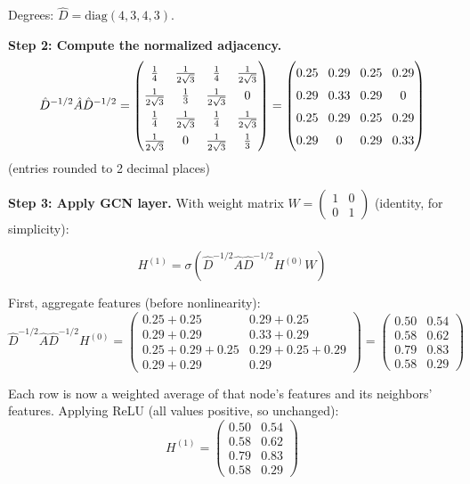 \begin{notechapter}
\begin{example}
Degrees: $\hat{D} = \text{diag}(4, 3, 4, 3)$.

\textbf{Step 2: Compute the normalized adjacency.}
\[
\hat{D}^{-1/2} \hat{A} \hat{D}^{-1/2} =
{
\renewcommand{\arraystretch}{1.5} %
\setlength{\arraycolsep}{4pt}    %
\begin{pmatrix} 
\frac{1}{4} & \frac{1}{2\sqrt{3}} & \frac{1}{4} & \frac{1}{2\sqrt{3}} \\ 
\frac{1}{2\sqrt{3}} & \frac{1}{3} & \frac{1}{2\sqrt{3}} & 0 \\ 
\frac{1}{4} & \frac{1}{2\sqrt{3}} & \frac{1}{4} & \frac{1}{2\sqrt{3}} \\ 
\frac{1}{2\sqrt{3}} & 0 & \frac{1}{2\sqrt{3}} & \frac{1}{3} 
\end{pmatrix}
=
\begin{pmatrix} 
0.25 & 0.29 & 0.25 & 0.29 \\ 
0.29 & 0.33 & 0.29 & 0 \\ 
0.25 & 0.29 & 0.25 & 0.29 \\ 
0.29 & 0 & 0.29 & 0.33 
\end{pmatrix}
}
\]
(entries rounded to 2 decimal places)

\textbf{Step 3: Apply GCN layer.} With weight matrix 
$W = \begin{pmatrix} 1 & 0 \\ 0 & 1 \end{pmatrix}$ (identity, for simplicity):

\[
H^{(1)} = \sigma\left( \hat{D}^{-1/2} \hat{A} \hat{D}^{-1/2} H^{(0)} W \right)
\]

First, aggregate features (before nonlinearity):
\[
\hat{D}^{-1/2} \hat{A} \hat{D}^{-1/2} H^{(0)} = 
\begin{pmatrix} 
0.25 + 0.25 & 0.29 + 0.25 \\
0.29 + 0.29 & 0.33 + 0.29 \\
0.25 + 0.29 + 0.25 & 0.29 + 0.25 + 0.29 \\
0.29 + 0.29 & 0.29
\end{pmatrix}
= \begin{pmatrix} 
0.50 & 0.54 \\
0.58 & 0.62 \\
0.79 & 0.83 \\
0.58 & 0.29
\end{pmatrix}
\]

Each row is now a weighted average of that node's features and its 
neighbors' features. Applying ReLU (all values positive, so unchanged):
\[
H^{(1)} = \begin{pmatrix} 
0.50 & 0.54 \\
0.58 & 0.62 \\
0.79 & 0.83 \\
0.58 & 0.29
\end{pmatrix}
\]


\end{example}
\end{notechapter}
